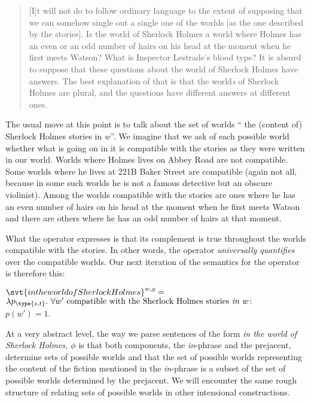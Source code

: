 \begin{quote}
  [I]t will not do to follow ordinary language to the extent of supposing that
  we can somehow single out a single one of the worlds [as the one described by
  the stories]. Is the world of Sherlock Holmes a world where Holmes has an even
  or an odd number of hairs on his head at the moment when he first meets
  Watson? What is Inspector Lestrade's blood type? It is absurd to suppose that
  these questions about the world of Sherlock Holmes have answers. The best
  explanation of that is that the world\emph{s} of Sherlock Holmes are plural,
  and the questions have different answers at different ones.
\end{quote}
%
%
The usual move at this point is to talk about the set of worlds
`` the (content of) Sherlock Holmes stories in $w$''. We
imagine that we ask of each possible world whether what is going on in it is
compatible with the stories as they were written in our world. Worlds where
Holmes lives on Abbey Road are not compatible. Some worlds where he lives at
221B Baker Street are compatible (again not all, because in some such worlds he
is not a famous detective but an obscure violinist). Among the worlds compatible
with the stories are ones where he has an even number of hairs on his head at
the moment when he first meets Watson and there are others where he has an odd
number of hairs at that moment.

What the operator  expresses is that
its complement is true throughout the worlds compatible with the stories. In
other words, the operator \emph{universally quantifies} over the compatible
worlds. Our next iteration of the semantics for the operator is therefore this:

\ex $\svt{in the world of Sherlock Holmes}^{w,g} =$\\
$\lambda p_{\type{s,t}}.\ \forall w' \mbox{ compatible with the Sherlock Holmes
  stories \emph{in} } w\!:$\\
$p(w') = 1$. \xe

At a very abstract level, the way we parse sentences of the form \emph{in the
  world of Sherlock Holmes, $\phi$} is that both components, the
\emph{in}-phrase and the prejacent, determine sets of possible worlds and that
the set of possible worlds representing the content of the fiction mentioned in
the \emph{in}-phrase is a subset of the set of possible worlds determined by the
prejacent. We will encounter the same rough structure of relating sets of
possible worlds in other intensional constructions.

